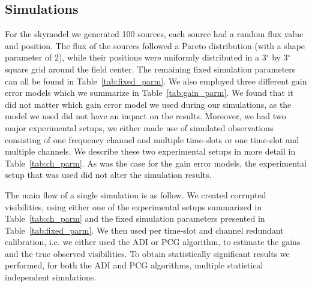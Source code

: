 \documentclass[useAMS,usenatbib]{mn2e}
\begin{document}
\subsection{Simulations}
\label{sec:simulations}
For the skymodel we generated 100 sources, each source had a random flux value and position. The flux of the sources followed a Pareto distribution (with a shape parameter of 2), while their positions were uniformly 
distributed in a 3$^{\circ}$ by 3$^{\circ}$ square grid around the field center. The remaining fixed simulation parameters can all be found in Table~\ref{tab:fixed_parm}. 
We also employed three different gain error models which we summarize in Table~\ref{tab:gain_parm}. We found that it did not matter which gain error model we used during
our simulations, as the model we used did not have an impact on the results. Moreover, we had two major experimental setups, we either made use of simulated observations consisting of one frequency channel and multiple time-slots or one time-slot and multiple channels.
We describe these two experimental setups in more detail in Table~\ref{tab:ch_parm}. As was the case for the gain error models, the experimental setup 
that was used did not alter the simulation results. 

The main flow of a single simulation is as follow. We created corrupted visibilities, using either one of the experimental setups summarized in Table~\ref{tab:ch_parm} and
the fixed simulation parameters presented in Table~\ref{tab:fixed_parm}. We then used per time-slot and channel redundant calibration, i.e. we either used the ADI or PCG algorithm, to 
estimate the gains and the true observed visibilities. To obtain statistically significant results we performed, for both the ADI and PCG algorithms, multiple statistical independent simulations. 


\end{document}
